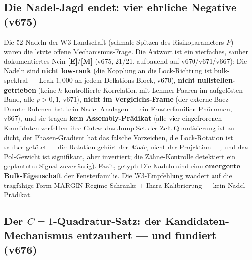\documentclass[11pt,a4paper]{article}
\newcommand{\E}{\textcolor{gut}{\textbf{[E]}}}
\newcommand{\M}{\textcolor{mess}{\textbf{[M]}}}
\begin{document}
\subsection*{Die Nadel-Jagd endet: vier ehrliche Negative (v675)}

Die 52 \glqq{}Nadeln\grqq{} der W3-Landschaft (schmale Spitzen des
Risikoparameters $P$) waren die letzte offene Mechanismus-Frage.
Die Antwort ist ein vierfaches, sauber dokumentiertes Nein \E{}/\M{}
(v675, 21/21, aufbauend auf v670/v671/v667): Die Nadeln sind
\textbf{nicht low-rank} (die Kopplung an die Lock-Richtung ist
bulk-spektral --- Leak $1{,}000$ an jedem Deflations-Block, v670),
\textbf{nicht nullstellen-getrieben} (keine $h$-kontrollierte
Korrelation mit Lehmer-Paaren im aufgelösten Band, alle $p > 0{,}1$,
v671), \textbf{nicht im Vergleichs-Frame} (der externe
Baez--Duarte-Rahmen hat kein Nadel-Analogon --- ein
Fensterfamilien-Phänomen, v667), und sie tragen \textbf{kein
Assembly-Prädikat} (alle vier eingefrorenen Kandidaten verfehlen
ihre Gates: das Jump-Set der Zelt-Quantisierung ist zu dicht,
der Phasen-Gradient hat das falsche Vorzeichen, die Lock-Rotation
ist sauber getötet --- die Rotation gehört der \emph{Mode}, nicht
der Projektion ---, und das Pol-Gewicht ist signifikant, aber
invertiert; die Zähne-Kontrolle detektiert ein geplantetes Signal
zuverlässig). Fazit, getypt: Die Nadeln sind eine \textbf{emergente
Bulk-Eigenschaft} der Fensterfamilie. Die W3-Empfehlung wandert auf
die tragfähige Form \glqq{}MARGIN-Regime-Schranke $+$
Ihara-Kalibrierung\grqq{} --- kein Nadel-Prädikat.

\subsection*{Der $C = 1$-Quadratur-Satz: der Kandidaten-Mechanismus
entzaubert --- und fundiert (v676)}
\end{document}
